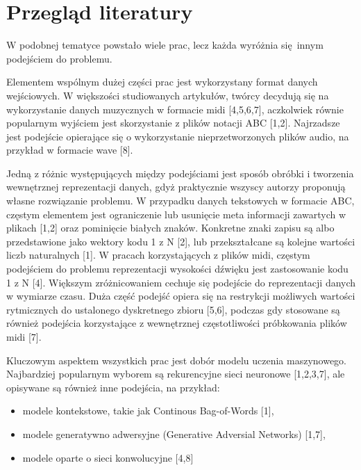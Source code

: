 {  \section{Przegląd literatury}
  {
    W podobnej tematyce powstało wiele prac, lecz każda wyróżnia 
    się innym podejściem do problemu.

    Elementem wspólnym dużej części prac jest wykorzystany format danych wejściowych.
    W większości studiowanych artykułów, twórcy decydują się na wykorzystanie 
    danych muzycznych w formacie midi [4,5,6,7], aczkolwiek równie popularnym wyjściem
    jest skorzystanie z plików notacji ABC [1,2]. Najrzadsze jest podejście opierające się o
    wykorzystanie nieprzetworzonych plików audio, na przykład w formacie wave [8].
    
    Jedną z różnic występujących między podejściami jest sposób obróbki i tworzenia
    wewnętrznej reprezentacji danych, gdyż praktycznie wszyscy autorzy 
    proponują własne rozwiązanie problemu. 
    W przypadku danych tekstowych w formacie ABC, częstym elementem jest ograniczenie
    lub usunięcie meta informacji zawartych w plikach [1,2] oraz pominięcie białych znaków.
    Konkretne znaki zapisu są albo przedstawione jako wektory kodu 1 z N [2], 
    lub przekształcane są kolejne wartości liczb naturalnych [1].
    W pracach korzystających z plików midi, częstym podejściem do problemu reprezentacji wysokości
    dźwięku jest zastosowanie kodu 1 z N [4]. Większym zróżnicowaniem cechuje się podejście
    do reprezentacji danych w wymiarze czasu. Duża część podejść opiera się na restrykcji możliwych
    wartości rytmicznych do ustalonego dyskretnego zbioru [5,6], podczas gdy stosowane są również podejścia
    korzystające z wewnętrznej częstotliwości próbkowania plików midi [7].

    Kluczowym aspektem wszystkich prac jest dobór modelu uczenia maszynowego.
    Najbardziej popularnym wyborem są rekurencyjne sieci neuronowe [1,2,3,7],
    ale opisywane są również inne podejścia, na przykład:
    \begin{itemize}
      \item modele kontekstowe, takie jak Continous Bag-of-Words [1],
      \item modele generatywno adwersyjne (Generative Adversial Networks) [1,7],
      \item modele oparte o sieci konwolucyjne [4,8]
    \end{itemize}

}}
